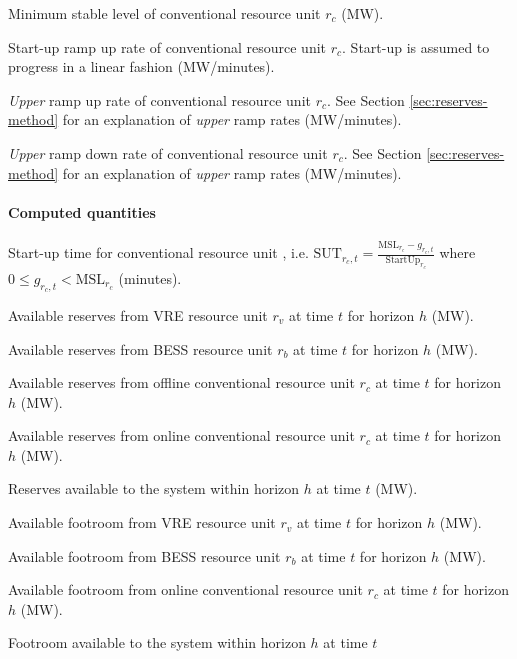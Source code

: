 \documentclass[12pt,a4paper,]{report}
\begin{document}
\begin{description}[leftmargin=8em,style=nextline]
  \item[$\mathrm{MSL}_{r_c}$] Minimum stable level of conventional resource unit $r_c$ (MW).
  \item[$\mathrm{StartUp}_{r_c}$] Start-up ramp up rate of conventional resource unit $r_c$. Start-up is assumed to progress in a linear fashion (MW/minutes).
  \item[$\mathrm{RampUp}_{r_c}$] \textit{Upper} ramp up rate of conventional resource  unit $r_c$. See Section \ref{sec:reserves-method} for an explanation of \textit{upper} ramp rates (MW/minutes).
  \item[$\mathrm{RampDown}_{r_c}$] \textit{Upper} ramp down rate of conventional resource  unit $r_c$. See Section \ref{sec:reserves-method} for an explanation of \textit{upper} ramp rates (MW/minutes).
\end{description}

\hypertarget{computed-quantities}{%
\paragraph{Computed quantities}\label{computed-quantities}}

\begin{description}[leftmargin=8em,style=nextline]
  \item[$\mathrm{SUT}_{r_c,t}$] Start-up time for conventional resource unit , i.e. $ \mathrm{SUT}_{r_c,t}=\frac{\mathrm{MSL}_{r_c}-g_{r_c,t}}{\mathrm{StartUp}_{r_c}}$ where $0 \leq g_{r_c, t} < \mathrm{MSL}_{r_c}$ (minutes).
  \item[$AR_{r_v,h,t}$] Available reserves from VRE resource unit $r_v$ at time $t$ for horizon $h$ (MW).
  \item[$AR_{r_b,h,t}$] Available reserves from BESS resource unit $r_b$ at time $t$ for horizon $h$ (MW).
  \item[$AR^{OFF}_{r_c,h,t}$] Available reserves from offline conventional resource unit $r_c$ at time $t$ for horizon $h$ (MW).
  \item[$AR^{ON}_{r_c,h,t}$] Available reserves from online conventional resource unit $r_c$ at time $t$ for horizon $h$ (MW).
 \item[$AR_{h,t}$] Reserves available to the system within horizon $h$ at time $t$ (MW).
 \item[$AF_{r_v,h,t}$] Available footroom from VRE resource unit $r_v$ at time $t$ for horizon $h$ (MW).
 \item[$AF_{r_b,h,t}$] Available footroom from BESS resource unit $r_b$ at time $t$ for horizon $h$ (MW).
 \item[$AF^{ON}_{r_c,h,t}$] Available footroom from online conventional resource unit $r_c$ at time $t$ for horizon $h$ (MW).
 \item[$AF_{h,t}$] Footroom available to the system within horizon $h$ at time $t$
\end{description}
\end{document}
